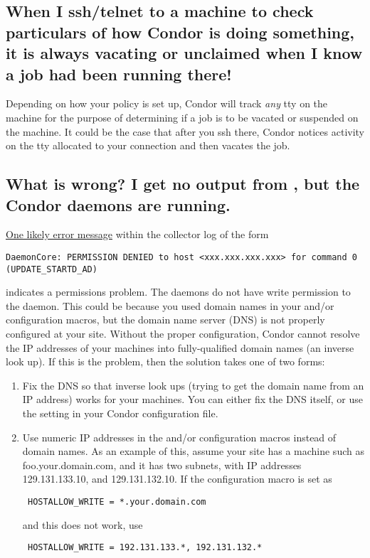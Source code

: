 \subsection*{When I ssh/telnet to a machine to check particulars of how
Condor is doing something, it is always vacating or unclaimed when I
know a job had been running there!}

Depending on how your policy is set up, Condor will track \emph{any} tty
on the machine for the purpose of determining if a job is to be vacated
or suspended on the machine. It could be the case that after you ssh
there, Condor notices activity on the tty allocated to your connection
and then vacates the job.

\subsection*{What is wrong? I get no output from , but the Condor daemons are running.}

\underline{One likely error message} within the collector log of the form
\footnotesize
\begin{verbatim}
DaemonCore: PERMISSION DENIED to host <xxx.xxx.xxx.xxx> for command 0 (UPDATE_STARTD_AD)
\end{verbatim}
\normalsize
indicates a permissions problem.
The  daemons do not have write permission to the
 daemon.
This could be because
you used domain names in your  and/or
 configuration macros,
but the domain name server (DNS) is not properly configured at your site.
Without the proper configuration, Condor cannot resolve
the IP addresses of your machines
into fully-qualified domain names (an inverse look up).
If this is the problem, then the solution takes one of two forms:
\begin{enumerate}
\item Fix the DNS so that inverse look ups (trying to get the domain name
   from an IP address) works for your machines.  You can
   either fix the DNS itself,
   or use the  setting in your Condor
         configuration file.
\item Use numeric IP addresses in the  and/or
    configuration macros
   instead of domain names.
   As an example of this, assume your site has a machine such as
   foo.your.domain.com, and it has two subnets, with IP addresses
   129.131.133.10, and 129.131.132.10.
   If the configuration macro is set as 

\begin{verbatim}
 HOSTALLOW_WRITE = *.your.domain.com
\end{verbatim}

   and this does not work, use

\begin{verbatim}
 HOSTALLOW_WRITE = 192.131.133.*, 192.131.132.*
\end{verbatim}
\end{enumerate}

